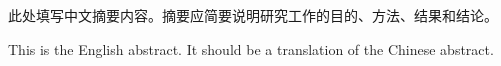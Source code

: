\begin{cabstract}
此处填写中文摘要内容。摘要应简要说明研究工作的目的、方法、结果和结论。

\end{cabstract}

\begin{eabstract}
This is the English abstract. It should be a translation of the Chinese abstract.

\end{eabstract}
